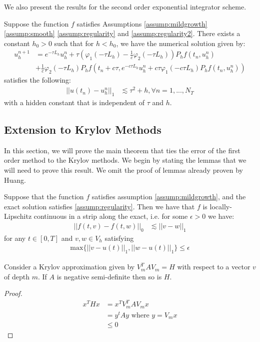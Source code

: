 We also present the results for the second order exponential integrator scheme.
\begin{theorem}\label{theorem:standard2}
    Suppose the function $f$ satisfies Assumptions \ref{assump:mildgrowth} \ref{assump:smooth} \ref{assump:regularity} and \ref{assump:regularity2}.
    There exists a constant $h_0 > 0$ such that for $h<h_0$, we have the numerical solution given by:
    \begin{align*}
        u_h^{n+1} &= e^{-\tau L_h}u_h^n + \tau (\varphi_1(-\tau L_h) - \frac{1}{c}\varphi_2(-\tau L_h))P_hf(t_n,u_h^n)\\
        &+\frac{1}{c}\varphi_2(-\tau L_h)P_hf(t_n + c\tau,e^{-c\tau L_h}u_h^n + c\tau\varphi_1(-c\tau L_h)P_hf(t_n,u_h^n))
    \end{align*}
    satisfies the following:
    \begin{align*}
        ||u(t_n) - u_h^n||_1 &\lesssim \tau^2 + h, \forall n =1,...,N_T
    \end{align*}
    with a hidden constant that is independent of $\tau$ and $h$.
\end{theorem}

\subsection{Extension to Krylov Methods}

In this section, we will prove the main theorem that ties the error of the first order method to the Krylov methods.
We begin by stating the lemmas that we will need to prove this result.
We omit the proof of lemmas already proven by Huang\cite{Huang2022}.

\begin{lemma} \label{lemma:Lipschitz}
    Suppose that the function $f$ satisfies assumption \ref{assump:mildgrowth}, and the exact solution satisfies \ref{assump:regularity}.
    Then we have that $f$ is locally-Lipschitz continuous in a strip along the exact, i.e. for some $\epsilon > 0$ we have:
    \begin{align*}
        ||f(t,v) - f(t,w)||_0 &\lesssim ||v-w||_1
    \end{align*}
    for any $t\in [0,T]$ and $v,w \in V_h$ satisfying
    \begin{align*}
        \text{max}\{||v-u(t)||_1,||w-u(t)||_1\}\leq \epsilon
    \end{align*}
\end{lemma}

\begin{lemma} \label{lemma:Hnegatvesemidefinite}
    Consider a Krylov approximation given by $V_m^TAV_m = H$ with respect to a vector $v$ of depth $m$.
    If $A$ is negative semi-definite then so is $H$.
\end{lemma}
\begin{proof}
    \begin{align*}
        x^T Hx &= x^T V_m^TAV_mx\\
        &= y^tAy \text{ where $y = V_mx$}\\
        &\leq 0
    \end{align*}
\end{proof}

